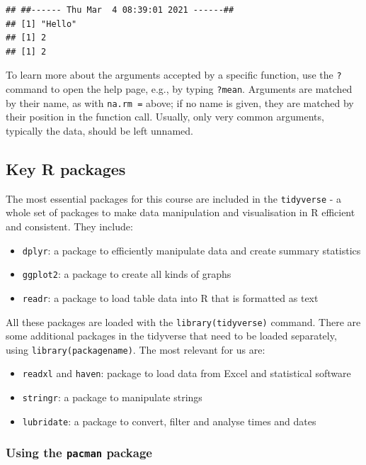 \documentclass[
]{book}
\providecommand{\tightlist}{%
  \setlength{\itemsep}{0pt}\setlength{\parskip}{0pt}}
\begin{document}
\begin{verbatim}
## ##------ Thu Mar  4 08:39:01 2021 ------##
## [1] "Hello"
## [1] 2
## [1] 2
\end{verbatim}

To learn more about the arguments accepted by a specific function, use the \texttt{?} command to open the help page, e.g., by typing \texttt{?mean}. Arguments are matched by their name, as with \texttt{na.rm\ =} above; if no name is given, they are matched by their position in the function call. Usually, only very common arguments, typically the data, should be left unnamed.

\hypertarget{key-r-packages}{%
\subsection{Key R packages}\label{key-r-packages}}

The most essential packages for this course are included in the \texttt{tidyverse} - a whole set of packages to make data manipulation and visualisation in R efficient and consistent. They include:

\begin{itemize}
\tightlist
\item
  \texttt{dplyr}: a package to efficiently manipulate data and create summary statistics
\item
  \texttt{ggplot2}: a package to create all kinds of graphs
\item
  \texttt{readr}: a package to load table data into R that is formatted as text
\end{itemize}

All these packages are loaded with the \texttt{library(tidyverse)} command. There are some additional packages in the tidyverse that need to be loaded separately, using \texttt{library(packagename)}. The most relevant for us are:

\begin{itemize}
\tightlist
\item
  \texttt{readxl} and \texttt{haven}: package to load data from Excel and statistical software
\item
  \texttt{stringr}: a package to manipulate strings
\item
  \texttt{lubridate}: a package to convert, filter and analyse times and dates
\end{itemize}

\hypertarget{using-the-pacman-package}{%
\subsubsection{\texorpdfstring{Using the \texttt{pacman} package}{Using the pacman package}}\label{using-the-pacman-package}}
\end{document}
